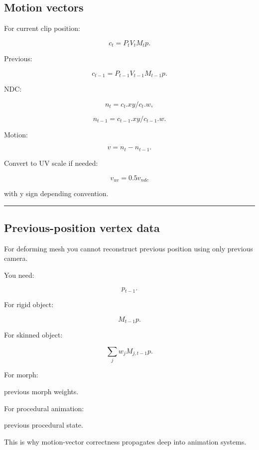 \subsection{Motion vectors}\label{04-visual-computing-ii-ch040-motion-vectors}

\hypertarget{04-visual-computing-ii-ch040-motion-vectors}{}

For current clip position:

\[
c_t=
P_tV_tM_tp.
\]

Previous:

\[
c_{t-1}
=
P_{t-1}
V_{t-1}
M_{t-1}
p.
\]

NDC:

\[
n_t=
c_t.xy/c_t.w,
\]

\[
n_{t-1}
=
c_{t-1}.xy/c_{t-1}.w.
\]

Motion:

\[
\boxed{
v=
n_t-n_{t-1}.
}
\]

Convert to UV scale if needed:

\[
v_{uv}=0.5v_{ndc}
\]

with y sign depending convention.

\begin{center}\rule{0.5\linewidth}{0.5pt}\end{center}

\subsection{Previous-position vertex data}\label{04-visual-computing-ii-ch040-previous-position-vertex-data}

\hypertarget{04-visual-computing-ii-ch040-previous-position-vertex-data}{}

For deforming mesh you cannot reconstruct previous position using only previous camera.

You need:

\[
p_{t-1}.
\]

For rigid object:

\[
M_{t-1}p.
\]

For skinned object:

\[
\sum_j
w_j
M_{j,t-1}p.
\]

For morph:

previous morph weights.

For procedural animation:

previous procedural state.

This is why motion-vector correctness propagates deep into animation systems.

